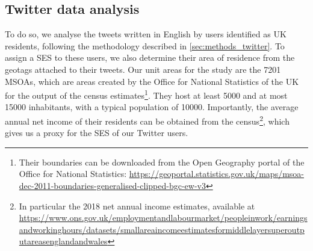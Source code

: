 \documentclass[../thesis.tex]{subfiles}
\begin{document}
\subsection{Twitter data analysis}
To do so, we analyse the tweets written in English by users identified as UK residents,
following the methodology described in \cref{sec:methods_twitter}. To assign a \ac{SES}
to these users, we also determine their area of residence from the geotags attached to
their tweets. Our unit areas for the study are the \SI{7201}{} \acp{MSOA}, which are
areas created by the Office for National Statistics of the UK for the output of the
census estimates\footnote{Their boundaries can be downloaded from the Open Geography
portal of the Office for National Statistics:
\url{https://geoportal.statistics.gov.uk/maps/msoa-dec-2011-boundaries-generalised-clipped-bgc-ew-v3}}.
They host at least \SI{5000}{} and at most \SI{15000}{} inhabitants, with a typical
population of \SI{10000}{}. Importantly, the average annual net income of their
residents can be obtained from the census\footnote{In particular the 2018 net annual
income estimates, available at
\url{https://www.ons.gov.uk/employmentandlabourmarket/peopleinwork/earningsandworkinghours/datasets/smallareaincomeestimatesformiddlelayersuperoutputareasenglandandwales}},
which gives us a proxy for the \ac{SES} of our Twitter users.
\end{document}
